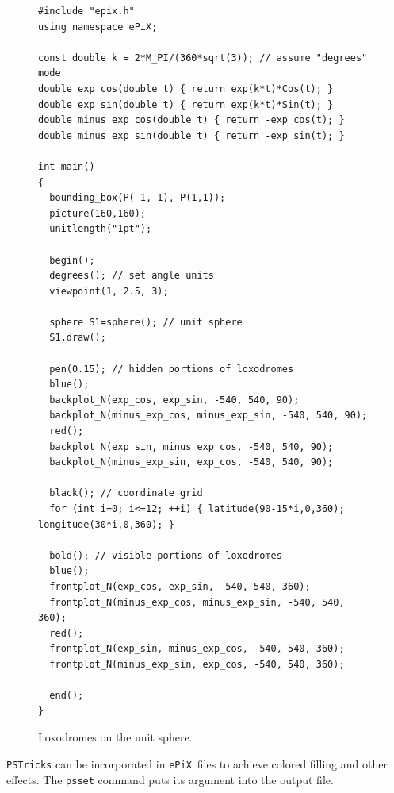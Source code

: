\documentclass[11pt]{article}
\newcommand{\ePiX}{\texttt{ePiX}}
\begin{document}
\begin{figure}[hbt]
\begin{center}

\vspace*{-150pt}
\begin{scriptsize}
\begin{verbatim}
#include "epix.h"
using namespace ePiX;

const double k = 2*M_PI/(360*sqrt(3)); // assume "degrees" mode
double exp_cos(double t) { return exp(k*t)*Cos(t); }
double exp_sin(double t) { return exp(k*t)*Sin(t); }
double minus_exp_cos(double t) { return -exp_cos(t); }
double minus_exp_sin(double t) { return -exp_sin(t); }

int main()
{
  bounding_box(P(-1,-1), P(1,1));
  picture(160,160);
  unitlength("1pt");

  begin();
  degrees(); // set angle units
  viewpoint(1, 2.5, 3);

  sphere S1=sphere(); // unit sphere
  S1.draw();

  pen(0.15); // hidden portions of loxodromes
  blue();
  backplot_N(exp_cos, exp_sin, -540, 540, 90);
  backplot_N(minus_exp_cos, minus_exp_sin, -540, 540, 90);
  red();
  backplot_N(exp_sin, minus_exp_cos, -540, 540, 90);
  backplot_N(minus_exp_sin, exp_cos, -540, 540, 90);

  black(); // coordinate grid
  for (int i=0; i<=12; ++i) { latitude(90-15*i,0,360); longitude(30*i,0,360); }

  bold(); // visible portions of loxodromes
  blue();
  frontplot_N(exp_cos, exp_sin, -540, 540, 360);
  frontplot_N(minus_exp_cos, minus_exp_sin, -540, 540, 360);
  red();
  frontplot_N(exp_sin, minus_exp_cos, -540, 540, 360);
  frontplot_N(minus_exp_sin, exp_cos, -540, 540, 360);

  end();
}
\end{verbatim}
\end{scriptsize}
\caption{Loxodromes on the unit sphere.}
\label{fig:sphere}
\end{center}
\end{figure}

\clearpage

\noindent \texttt{PSTricks} can be incorporated in \ePiX\ files to 
achieve colored filling and other effects. The \texttt{psset} command
puts its argument into the output file.
\end{document}
